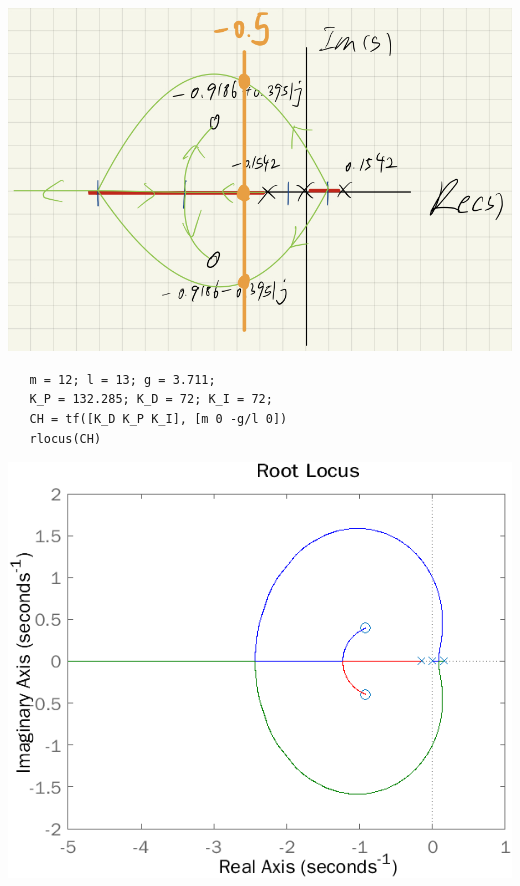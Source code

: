 \begin{questions}
\begin{solution}
   \begin{minipage}[htbp]{\linewidth}
      \centering
      \includegraphics[scale=0.55]{figures/-0.5.png}
   \end{minipage}


   \begin{verbatim}
   m = 12; l = 13; g = 3.711;
   K_P = 132.285; K_D = 72; K_I = 72;
   CH = tf([K_D K_P K_I], [m 0 -g/l 0])
   rlocus(CH)
   \end{verbatim}
   \begin{minipage}[htbp]{\linewidth}
      \centering
      \includegraphics[scale=0.7]{figures/root_locus_matlab.png}
   \end{minipage}


\end{solution}
\end{questions}
